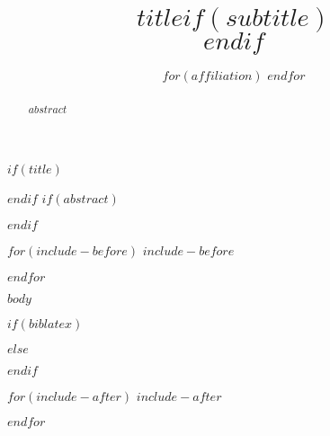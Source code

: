 \documentclass[conference]{IEEEtran}
\title{$title$$if(subtitle)$\\\vspace{0.5em}{\large $subtitle$}$endif$}
\author{
  \IEEEauthorblockN{$for(author)$$author.name$\IEEEauthorrefmark{$author.affiliation$}$sep$,  
  $endfor$}
  $for(affiliation)$
  \IEEEauthorblockA{
    \IEEEauthorrefmark{$affiliation.code$}$affiliation.organization$ \\
                      $affiliation.address$ \\
                      Email: {\tt $affiliation.email$}}
  $endfor$
  }
\begin{document}
$if(title)$
\maketitle
$endif$
$if(abstract)$
\begin{abstract}
$abstract$
\end{abstract}
$endif$

$for(include-before)$
$include-before$

$endfor$

$body$


$if(biblatex)$


$else$

 
$endif$

$for(include-after)$
$include-after$

$endfor$
\end{document}
